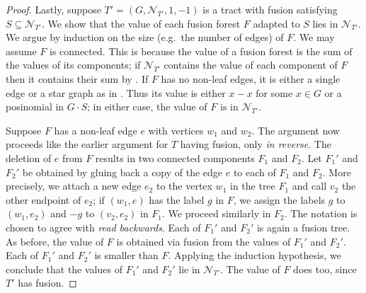 \documentclass[reqno]{amsart}
\newtheorem{Prop}[Thm]{Proposition}
\theoremstyle{definition}
\theoremstyle{remark}
\newcommand{\Nc}{\mathcal{N}}
\begin{document}
\begin{proof}
    Lastly, suppose $T' = (G, \Nc_{T'}, 1, -1)$ is a tract with fusion satisfying $S \subseteq \Nc_{T'}$. We  show that the value of each fusion forest $F$ adapted to $S$ lies in $\mathcal{N}_{T'}$. 
    We argue by induction on the size (e.g.\ the number of edges) of $F$. 
    We may assume $F$ is connected.
    This is because the value of a fusion forest is the sum of the values of its components; if $\mathcal{N}_{T'}$ contains the value of each component of $F$ then it contains their sum by .
    If $F$ has no non-leaf edges, it is either a single edge or a star graph as in .
    Thus its value is either $x-x$ for some $x \in G$ or a posinomial in $G \cdot S$; in either case, the value of $F$ is in $\mathcal{N}_{T'}$.
    
    Suppose $F$ has a non-leaf edge $e$ with vertices $w_1$ and $w_2$.
    The argument now proceeds like the earlier argument for ${T}$ having fusion, only \emph{in reverse}.
    The deletion of $e$ from $F$ results in two connected components $F_1$ and $F_2$.
    Let $F_1'$ and $F_2'$ be obtained by gluing back a copy of the edge $e$ to each of $F_1$ and $F_2$. More precisely, we attach a new edge $e_2$ to the vertex $w_1$ in the tree $F_1$ and call $v_2$ the other endpoint of $e_2$; if $(w_1, e)$ has the label $g$ in $F$, we assign the labels 
    $g$ to $(w_1, e_2)$ and 
    $-g$ to $(v_2, e_2)$ in $F_1$. We proceed similarly in $F_2$.
    The notation is chosen to agree with  \emph{read backwards}.
    Each of $F_1'$ and $F_2'$ is again a fusion tree. 
    As before, the value of $F$ is obtained via fusion from the values of $F_1'$ and $F_2'$.
    Each of $F_1'$ and $F_2'$ is smaller than $F$.
    Applying the induction hypothesis, we conclude that the values of $F_1'$ and $F_2'$ lie in $\mathcal{N}_{T'}$. The value of $F$ does too, since $T'$ has fusion.
    \end{proof}

    
\end{document}
